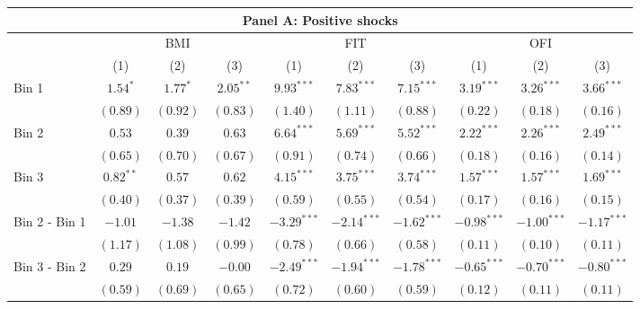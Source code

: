\begin{tabular}{lccccccccc}

  \hline \multicolumn{10}{c}{Panel A: Positive shocks} \\

  \hline

  & \multicolumn{3}{c}{BMI} & \multicolumn{3}{c}{FIT} & \multicolumn{3}{c}{OFI} \\

  \cmidrule(lr){2-4} \cmidrule(lr){5-7} \cmidrule(lr){8-10}

  & (1) & (2) & (3) & (1) & (2) & (3) & (1) & (2) & (3) \\

  Bin 1 & $1.54^{*}$ & $1.77^{*}$ & $2.05^{**}$ & $9.93^{***}$ & $7.83^{***}$ & $7.15^{***}$ & $3.19^{***}$ & $3.26^{***}$ & $3.66^{***}$ \\

   & $(0.89)$ & $(0.92)$ & $(0.83)$ & $(1.40)$ & $(1.11)$ & $(0.88)$ & $(0.22)$ & $(0.18)$ & $(0.16)$ \\

  Bin 2 & $0.53$ & $0.39$ & $0.63$ & $6.64^{***}$ & $5.69^{***}$ & $5.52^{***}$ & $2.22^{***}$ & $2.26^{***}$ & $2.49^{***}$ \\

   & $(0.65)$ & $(0.70)$ & $(0.67)$ & $(0.91)$ & $(0.74)$ & $(0.66)$ & $(0.18)$ & $(0.16)$ & $(0.14)$ \\

  Bin 3 & $0.82^{**}$ & $0.57$ & $0.62$ & $4.15^{***}$ & $3.75^{***}$ & $3.74^{***}$ & $1.57^{***}$ & $1.57^{***}$ & $1.69^{***}$ \\

   & $(0.40)$ & $(0.37)$ & $(0.39)$ & $(0.59)$ & $(0.55)$ & $(0.54)$ & $(0.17)$ & $(0.16)$ & $(0.15)$ \\

  Bin 2 - Bin 1 & $-1.01$ & $-1.38$ & $-1.42$ & $-3.29^{***}$ & $-2.14^{***}$ & $-1.62^{***}$ & $-0.98^{***}$ & $-1.00^{***}$ & $-1.17^{***}$ \\

   & $(1.17)$ & $(1.08)$ & $(0.99)$ & $(0.78)$ & $(0.66)$ & $(0.58)$ & $(0.11)$ & $(0.10)$ & $(0.11)$ \\

  Bin 3 - Bin 2 & $0.29$ & $0.19$ & $-0.00$ & $-2.49^{***}$ & $-1.94^{***}$ & $-1.78^{***}$ & $-0.65^{***}$ & $-0.70^{***}$ & $-0.80^{***}$ \\

   & $(0.59)$ & $(0.69)$ & $(0.65)$ & $(0.72)$ & $(0.60)$ & $(0.59)$ & $(0.12)$ & $(0.11)$ & $(0.11)$ \\


\end{tabular}
